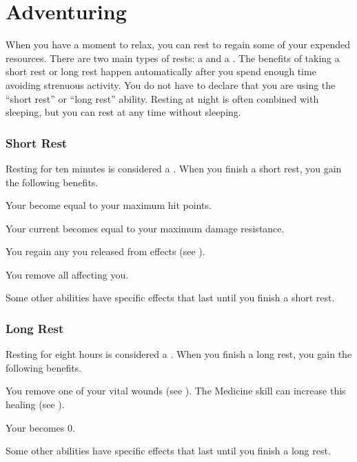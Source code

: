 \chapter{Adventuring}\label{Adventuring}


  When you have a moment to relax, you can rest to regain some of your expended resources.
  There are two main types of rests: a  and a .
  The benefits of taking a short rest or long rest happen automatically after you spend enough time avoiding strenuous activity.
  You do not have to declare that you are using the ``short rest'' or ``long rest'' ability.
  Resting at night is often combined with sleeping, but you can rest at any time without sleeping.


  \subsection{Short Rest}\label{Short Rest}
    Resting for ten minutes is considered a .
    When you finish a short rest, you gain the following benefits.
    \begin{raggeditemize}
      \item Your  become equal to your maximum hit points.
      \item Your current  becomes equal to your maximum damage resistance.
      \item You regain any  you released from  effects (see ).
      \item You remove all  affecting you.
      \item Some other abilities have specific effects that last until you finish a short rest.
    \end{raggeditemize}

  \subsection{Long Rest}\label{Long Rest}
    Resting for eight hours is considered a .
    When you finish a long rest, you gain the following benefits.
    \begin{raggeditemize}
      \item You remove one of your vital wounds (see ).
        The Medicine skill can increase this healing (see ).
      \item Your  becomes 0.
      \item Some other abilities have specific effects that last until you finish a long rest.
    \end{raggeditemize}

